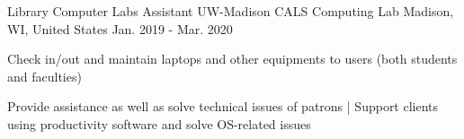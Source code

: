 \begin{cventries}
  \cventry
  {Library Computer Labs Assistant} %
  {UW-Madison CALS Computing Lab} %
  {Madison, WI, United States} %
  {Jan. 2019 - Mar. 2020} %
  {
    \begin{cvitems} %
      \item {Check in/out and maintain laptops and other equipments to users (both students and faculties)}
      \item {Provide assistance as well as solve technical issues of patrons | Support clients using productivity software and solve OS-related issues}
    \end{cvitems}
  }


\end{cventries}
